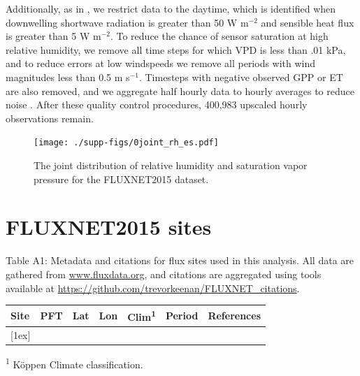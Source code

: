 \documentclass[12pt]{article}
\begin{document}
Additionally, as in \citet{Lin_2018}, we restrict data to the daytime,
which is identified when downwelling shortwave radiation is greater
than 50 W m$^{-2}$ and sensible heat flux is greater than 5 W
m$^{-2}$. To reduce the chance of sensor saturation at high relative
humidity, we remove all time steps for which VPD is less than .01 kPa,
and to reduce errors at low windspeeds we remove all periods with wind
magnitudes less than 0.5 m s$^{-1}$. Timesteps with negative observed
GPP or ET are also removed, and we aggregate half hourly data to
hourly averages to reduce noise \citep{Lin_2018}.  After these quality
control procedures, 400,983 upscaled hourly observations remain.


\begin{figure}
  \centering \texttt{[image: ./supp-figs/0joint\_rh\_es.pdf]}
  \caption{The joint distribution of relative humidity and saturation
    vapor pressure for the FLUXNET2015 dataset.}
  \end{figure}




\section{FLUXNET2015 sites}
  Table A1: Metadata and citations for flux sites used in this analysis. All data are gathered from \url{www.fluxdata.org}, and citations are aggregated using tools available at \url{https://github.com/trevorkeenan/FLUXNET_citations}.
  \begin{longtable}{l l l l l l l}
    \hline
    \textbf{Site} &
    \textbf{PFT} &
    \textbf{Lat} &
    \textbf{Lon} &
    \textbf{Clim\textsuperscript{1}} &
    \textbf{Period} &
    \textbf{References} \\
    [0.5ex]
    \hline
    
    [1ex]
    \hline
  \end{longtable}
\textsuperscript{1} K{\"o}ppen Climate classification.


\end{document}
